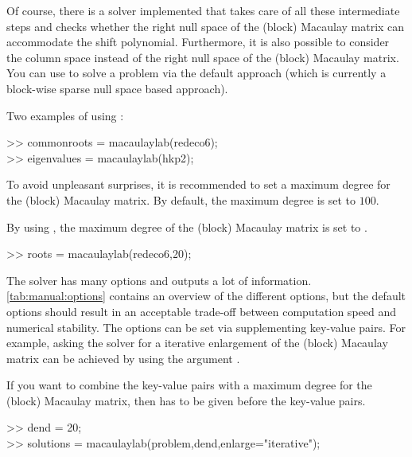 \documentclass{manual}
\begin{document}
            Of course, there is a solver implemented that takes care of all these intermediate steps and checks whether the right null space of the (block) Macaulay matrix can accommodate the shift polynomial.
            Furthermore, it is also possible to consider the column space instead of the right null space of the (block) Macaulay matrix.
            You can use  to solve a problem via the default approach (which is currently a block-wise sparse null space based approach). 
            \begin{code}
                Two examples of using :
                \begin{codeblock}
                    >> commonroots = macaulaylab(redeco6); \\
                    >> eigenvalues = macaulaylab(hkp2);
                \end{codeblock}
            \end{code}
            To avoid unpleasant surprises, it is recommended to set a maximum degree for the (block) Macaulay matrix.
            By default, the maximum degree is set to $100$.
            \begin{code}
                By using , the maximum degree of the (block) Macaulay matrix is set to .
                \begin{codeblock}
                    >> roots = macaulaylab(redeco6,20);
                \end{codeblock}
            \end{code}
            The solver has many options and outputs a lot of information.
            \cref{tab:manual:options} contains an overview of the different options, but the default options should result in an acceptable trade-off between computation speed and numerical stability.
            The options can be set via supplementing key-value pairs. 
            For example, asking the solver for a iterative enlargement of the (block) Macaulay matrix can be achieved by using the argument .
            \begin{code}
                If you want to combine the key-value pairs with a maximum degree for the (block) Macaulay matrix, then  has to be given before the key-value pairs.
                \begin{codeblock}
                    >> dend = 20; \\
                    >> solutions = macaulaylab(problem,dend,enlarge=\textcolor{string}{"iterative"});
                \end{codeblock}
            \end{code}
\end{document}
